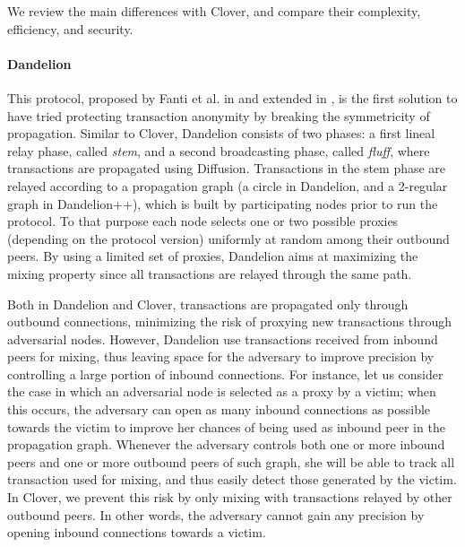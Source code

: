 \documentclass{article}
\begin{document}
	We review the main differences with Clover, and compare their complexity, efficiency, and security.
	
	\paragraph{Dandelion}
	This protocol, proposed by Fanti et al. in \cite{venkatakrishnan2017dandelion} and extended in \cite{fanti2018dandelion++}, is the first solution to have tried protecting transaction anonymity by breaking the symmetricity of propagation.
	Similar to Clover, Dandelion consists of two phases: a first lineal relay phase, called \textit{stem}, and a second broadcasting phase, called \textit{fluff}, where transactions are propagated using Diffusion.
	Transactions in the stem phase are relayed according to a propagation graph (a circle in Dandelion, and a 2-regular graph in Dandelion++), which is built by participating nodes prior to run the protocol.
	To that purpose each node selects one or two possible proxies (depending on the protocol version) uniformly at random among their outbound peers.
	By using a limited set of proxies, Dandelion aims at maximizing the mixing property since all transactions are relayed through the same path.
	
	Both in Dandelion and Clover, transactions are propagated only through outbound connections, minimizing the risk of proxying new transactions through adversarial nodes.
	However, Dandelion use transactions received from inbound peers for mixing, thus leaving space for the adversary to improve precision by controlling a large portion of inbound connections.
	For instance, let us consider the case in which an adversarial node is selected as a proxy by a victim;
	when this occurs, the adversary can open as many inbound connections as possible towards the victim to improve her chances of being used as inbound peer in the propagation graph.
	Whenever the adversary controls both one or more inbound peers and one or more outbound peers of such graph, she will be able to track all transaction used for mixing, and thus easily detect those generated by the victim.
	In Clover, we prevent this risk by only mixing with transactions relayed by other outbound peers.
	In other words, the adversary cannot gain any precision by opening inbound connections towards a victim.
	
\end{document}
